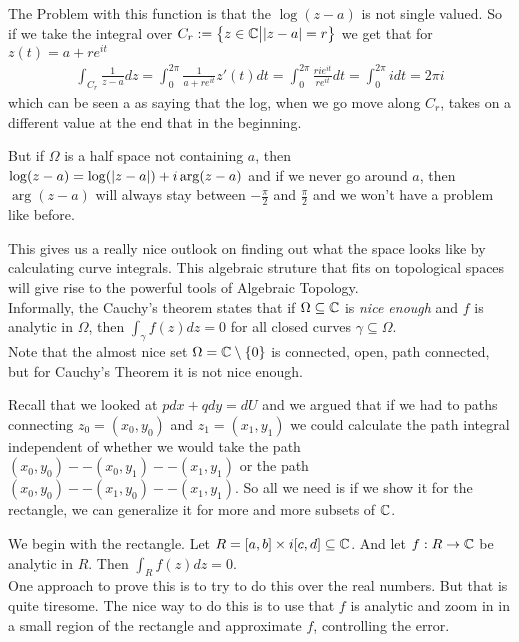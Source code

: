 The Problem with this function is that the $\log(z - a)$ is not single valued. So if we take the integral over $C_r := \left\{z \in \mathbb{C} \big\vert \vert z-a\vert = r\right\}$ we get that for $z(t) = a + re^{it}$
\begin{align*}
	\int_{C_r}\frac{1}{z-a}dz = \int_{0}^{2 \pi} \frac{1}{a + re^{it}} z'(t) dt = \int_{0}^{2 \pi} \frac{ri e^{it}}{re^{it}} dt = \int_{0}^{2 \pi} i dt = 2 \pi i
\end{align*}
which can be seen a as saying that the log, when we go move along $C_r$, takes on a different value at the end that in the beginning.

But if $\Omega$ is a half space not containing $a$, then $\log(z-a) = \log(\vert z-a\vert) + i \arg(z-a)$ and if we never go around $a$, then $\arg(z-a)$ will always stay between $-\frac{\pi}{2}$ and $\frac{\pi}{2}$ and we won't have a problem like before.

This gives us a really nice outlook on finding out what the space looks like by calculating curve integrals. This algebraic struture that fits on topological spaces will give rise to the powerful tools of Algebraic Topology.\\

Informally, the Cauchy's theorem states that if $\Omega \subseteq \mathbb{C}$ is \emph{nice enough} and $f$ is analytic in $\Omega$, then $\int_{\gamma}f(z) dz = 0$ for all closed curves $\gamma \subseteq \Omega$.\\


Note that the almost nice set $\Omega = \mathbb{C} \setminus \{0\}$ is connected, open, path connected, but for Cauchy's Theorem it is not nice enough.

Recall that we looked at $p dx + q dy = dU$ and we argued that if we had to paths connecting $z_0 = (x_0,y_0)$ and $z_1 = (x_1,y_1)$ we could  calculate the path integral independent of whether we would take the path $(x_0,y_0) -- (x_0,y_1) -- (x_1,y_1)$ or the path $(x_0,y_0) -- (x_1,y_0) -- (x_1,y_1)$. So all we need is if we show it for the rectangle, we can generalize it for more and more subsets of $\mathbb{C}$.

We begin with the rectangle. Let $R = [a,b] \times i[c,d] \subseteq \mathbb{C}$. And let $f: R \to \mathbb{C}$ be analytic in $R$. Then $\int_{R} f(z) dz = 0$.\\

One approach to prove this is to try to do this over the real numbers. But that is quite tiresome. The nice way to do this is to use that $f$ is analytic and zoom in in a small region of the rectangle and approximate $f$, controlling the error.

